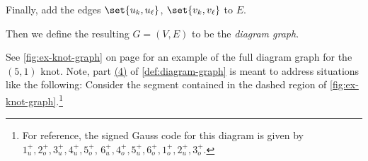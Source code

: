 \begin{definition}
\begin{enumerate}[label=(\arabic*)]
      Finally, add the edges $\set{u_k, u_{\ell}}$, $\set{v_k,
      v_{\ell}}$ to $E$.
  \end{enumerate}
  Then we define the resulting $G = (V, E)$ to be the \emph{diagram
    graph}.\qedhere
\end{definition}
See \cref{fig:ex-knot-graph} on page  for
an example of the full diagram graph for the $(5,1)$ knot. Note, part
\hyperlink{graph-step-4}{(4)} of \cref{def:diagram-graph} is meant to
address situations like the following: Consider the segment contained
in the dashed region of \cref{fig:ex-knot-graph}.\footnote{For
  reference, the signed Gauss code for this diagram is given by
  $1_u^+, 2_o^+, 3_u^+, 4_u^+, 5_o^+$, $ 6_u^+, 4_o^+, 5_u^+, 6_o^+,
  1_o^+, 2_u^+, 3_o^+$.}
